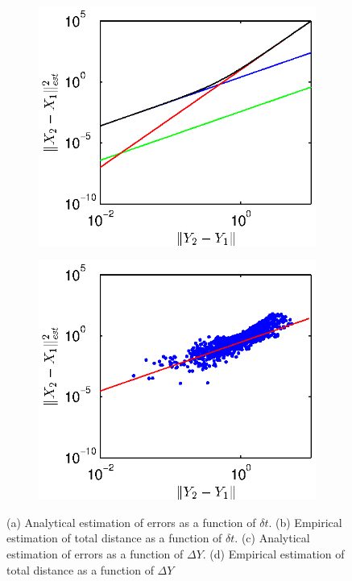 \documentclass[1p]{elsarticle}
\begin{document}
\begin{figure}[h]
\begin{subfigure}{0.5\textwidth}
\includegraphics[width=\textwidth]{errors_function_dy}
\caption{}
\end{subfigure}
\begin{subfigure}{0.5\textwidth}
\includegraphics[width=\textwidth]{empirical_totaldist_function_dy}
\caption{}
\end{subfigure}
\caption{(a) Analytical estimation of errors as a function of $\delta t$. 
%
(b) Empirical estimation of total distance as a function of $\delta t$.  
%
(c) Analytical estimation of errors as a function of $\Delta Y$. 
%
(d) Empirical estimation of total distance as a function of $\Delta Y$}
\end{figure}
\end{document}
